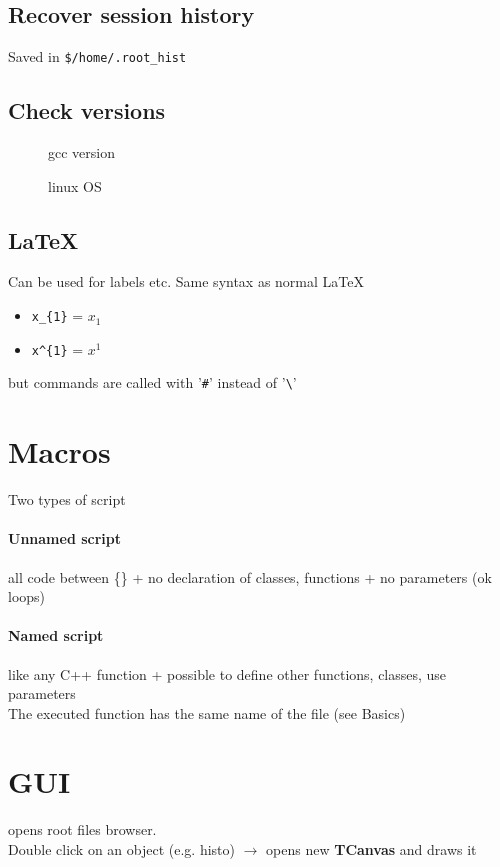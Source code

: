 \documentclass[10pt, twoside]{article}
\newcommand{\ttt}[1]{\colorbox{boxgray}{\texttt{#1}}}
\begin{document}
\subsection{Recover session history}
Saved in \ttt{\$/home/.root\_hist}

\subsection{Check versions}
\begin{description}
\item[] gcc version
\item[] linux OS
\end{description}


\subsection{\LaTeX{}}
Can be used for labels etc. Same syntax as normal \LaTeX{}
\begin{itemize}
\item \verb^x_{1}^ = $x_1$
\item \verb_x^{1}_ = $x^1$
\end{itemize}
but commands are called with '\ttt{\#}' instead of '\ttt{\textbackslash}'

\section{Macros}
Two types of script
\paragraph{Unnamed script} all code between \{\} + no declaration of classes, functions + no parameters (ok loops)
\paragraph{Named script} like any C++ function + possible to define other functions, classes, use parameters
\\The executed function has the same name of the file (see Basics)

\section{GUI}
 opens root files browser. 
\\Double click on an object (e.g. histo) $\rightarrow$ opens new \textbf{TCanvas} and draws it
\end{document}
